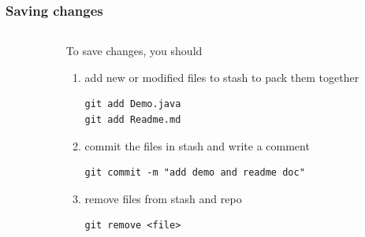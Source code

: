 \documentclass{beamer}
\begin{document}
\begin{frame}[fragile]
    \frametitle{Saving changes}
    \begin{columns}
        \begin{column}{0.4\textwidth}
            \centering
        \end{column}
        \begin{column}{0.5\textwidth}
            To save changes, you should
            \begin{enumerate}
                \item add new or modified files to stash to pack them together
                \begin{lstlisting}[morekeywords=git]
git add Demo.java
git add Readme.md
                \end{lstlisting}
                \item commit the files in stash and write a comment
                \begin{lstlisting}[morekeywords=git]
git commit -m "add demo and readme doc"
                \end{lstlisting}
                \item remove files from stash and repo
                \begin{lstlisting}[morekeywords=git]
git remove <file>
                \end{lstlisting}
            \end{enumerate}
        \end{column}
    \end{columns}
\end{frame}
\end{document}
